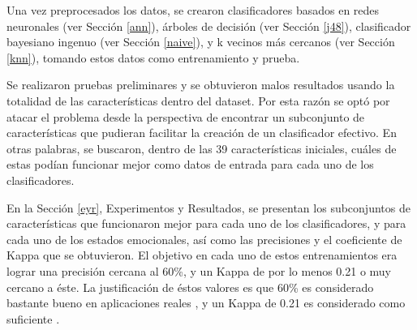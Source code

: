 Una vez preprocesados los datos, se crearon clasificadores basados en
redes neuronales (ver Sección \ref{ann}), árboles de decisión (ver
Sección \ref{j48}), clasificador bayesiano ingenuo (ver Sección
\ref{naive}), y k vecinos más cercanos (ver Sección \ref{knn}),
tomando estos datos como entrenamiento y prueba.

Se realizaron pruebas preliminares y se obtuvieron malos resultados
usando la totalidad de las características dentro del dataset. Por
esta razón se optó por atacar el problema desde la perspectiva de
encontrar un subconjunto de características que pudieran facilitar la
creación de un clasificador efectivo. En otras palabras, se buscaron,
dentro de las 39 características iniciales, cuáles de estas podían
funcionar mejor como datos de entrada para cada uno de los
clasificadores.

En la Sección \ref{eyr}, Experimentos y Resultados, se presentan los
subconjuntos de características que funcionaron mejor para cada uno de
los clasificadores, y para cada uno de los estados emocionales, así
como las precisiones y el coeficiente de Kappa que se obtuvieron. El
objetivo en cada uno de estos entrenamientos era lograr una precisión
cercana al 60\%, y un Kappa de por lo menos 0.21 o muy cercano a
éste. La justificación de éstos valores es que 60\% es considerado
bastante bueno en aplicaciones reales \cite{epp2011identifying}, y un
Kappa de 0.21 es considerado como suficiente \cite{landis1977measurement}.
